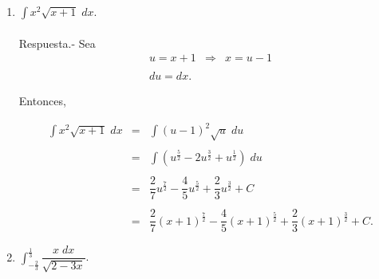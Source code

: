 \begin{enumerate}[\bfseries 1.]
    \item $\displaystyle\int x^2\sqrt{x+1}\; dx.$\\\\
	Respuesta.-\; Sea 
	$$\begin{array}{rcl}
	    u = x+1 & \Rightarrow & x=u-1\\\\
	    du=dx. &&
	\end{array}$$

	Entonces,

	$$\begin{array}{rcl}
	    \displaystyle \int x^2\sqrt{x+1}\; dx &=& \displaystyle\int (u-1)^2 \sqrt{u}\; du\\\\
						  &=& \displaystyle \int \left(u^{\frac{5}{2}}-2u^{\frac{3}{2}}+u^{\frac{1}{2}}\right)\; du\\\\
						  &=& \dfrac{2}{7}u^{\frac{7}{2}}-\dfrac{4}{5}u^{\frac{5}{2}}+\dfrac{2}{3}u^{\frac{3}{2}}+C\\\\
						  &=& \dfrac{2}{7}(x+1)^{\frac{7}{2}}-\dfrac{4}{5}(x+1)^{\frac{5}{2}}+\dfrac{2}{3}(x+1)^{\frac{3}{2}}+C.
	\end{array}$$
	\vspace{.5cm}

    \item $\displaystyle\int_{-\frac{2}{3}}^{\frac{1}{3}} \dfrac{x\; dx}{\sqrt{2-3x}}$.\\\\


\end{enumerate}
